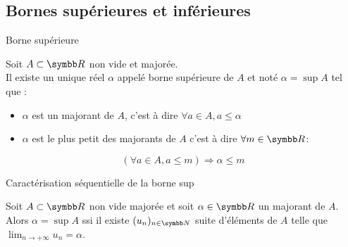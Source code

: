 \subsection{Bornes supérieures et inférieures}

\begin{theoreme}{Borne supérieure}{}

    Soit $A \subset \R$ non vide et majorée.\\

    Il existe un unique réel $\alpha$ appelé borne supérieure de $A$ et noté 
    $\alpha = \sup A$ tel que : 
    \begin{itemize}
        \item $\alpha$ est un majorant de $A$, c'est à dire $\forall a \in A, a \leqslant \alpha$
        \item $\alpha$ est le plus petit des majorants de $A$ c'est à dire $\forall m \in \R$: 
    \end{itemize}
    \[(\forall a \in A, a \leqslant m ) \Rightarrow \alpha \leqslant m\]
\end{theoreme}

\begin{theoreme}{Caractérisation séquentielle de la borne sup}{}

    Soit $A \subset \R$ non vide majorée et soit $\alpha \in \R$ un majorant de $A$. \\

    Alors $\alpha = \sup A$ ssi il existe $(u_n)_{n \in \N}$ suite d'éléments de $A$
    telle que $\lim_{n \to + \infty} u_n = \alpha$.
\end{theoreme}


